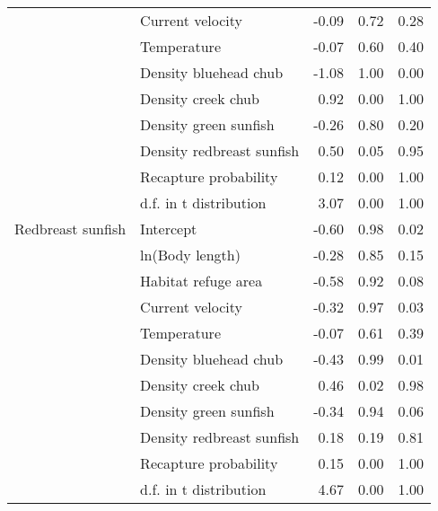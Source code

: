 \begin{table}[ht]
\begin{tabular}{llrrr}
   & Current velocity & -0.09 & 0.72 & 0.28 \\ 
   & Temperature & -0.07 & 0.60 & 0.40 \\ 
   & Density bluehead chub & -1.08 & 1.00 & 0.00 \\ 
   & Density creek chub & 0.92 & 0.00 & 1.00 \\ 
   & Density green sunfish & -0.26 & 0.80 & 0.20 \\ 
   & Density redbreast sunfish & 0.50 & 0.05 & 0.95 \\ 
   & Recapture probability & 0.12 & 0.00 & 1.00 \\ 
   & d.f. in t distribution & 3.07 & 0.00 & 1.00 \\ 
  Redbreast sunfish & Intercept & -0.60 & 0.98 & 0.02 \\ 
   & ln(Body length) & -0.28 & 0.85 & 0.15 \\ 
   & Habitat refuge area & -0.58 & 0.92 & 0.08 \\ 
   & Current velocity & -0.32 & 0.97 & 0.03 \\ 
   & Temperature & -0.07 & 0.61 & 0.39 \\ 
   & Density bluehead chub & -0.43 & 0.99 & 0.01 \\ 
   & Density creek chub & 0.46 & 0.02 & 0.98 \\ 
   & Density green sunfish & -0.34 & 0.94 & 0.06 \\ 
   & Density redbreast sunfish & 0.18 & 0.19 & 0.81 \\ 
   & Recapture probability & 0.15 & 0.00 & 1.00 \\ 
   & d.f. in t distribution & 4.67 & 0.00 & 1.00 \\ 
   \hline
\end{tabular}
\end{table}
